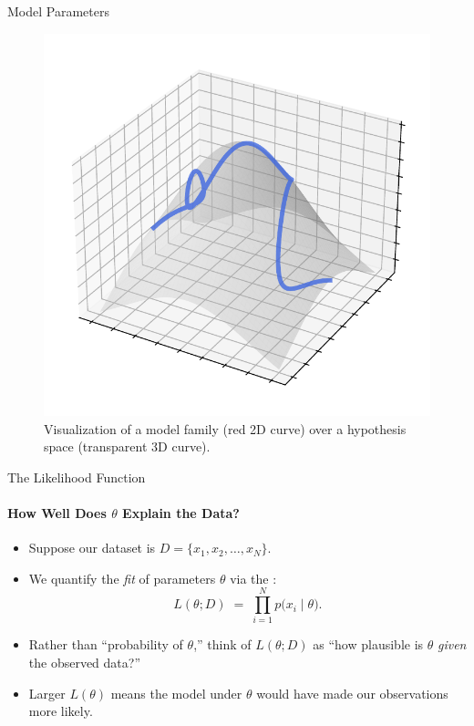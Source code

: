 \begin{frame}{Model Parameters}
  \begin{figure}
    \centering
    \includegraphics[height=0.65\textheight]{images/model_family_on_hypothesis_space.pdf}
    \caption{Visualization of a model family (red 2D curve) over a hypothesis space (transparent 3D curve).}
  \end{figure}
\end{frame}

\begin{frame}{The Likelihood Function}
  \framesubtitle{How Well Does $\theta$ Explain the Data?}
  \begin{itemize}
    \item Suppose our dataset is $D = \{x_1, x_2, \dots, x_N\}$.
    \item We quantify the \emph{fit} of parameters $\theta$ via the :
          \[
            L(\theta;D) \;=\;\prod_{i=1}^N p\bigl(x_i \mid \theta\bigr).
          \]
    \item Rather than “probability of $\theta$,” think of $L(\theta;D)$ as “how plausible is $\theta$ \emph{given} the observed data?”
    \item Larger $L(\theta)$ means the model under $\theta$ would have made our observations more likely.
  \end{itemize}
\end{frame}

